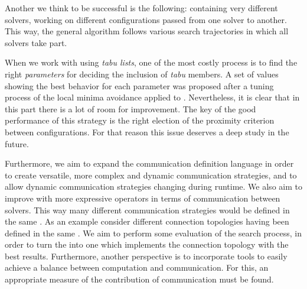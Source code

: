 
Another \commstr{} we think to be successful is the following: \sosets{} containing very different solvers, working on different configurations passed from one solver to another. This way, the general algorithm follows various search trajectories in which all solvers take part.

When we work with \commstrs{} using \textit{tabu lists}, one of the most costly process is to find the right {\it parameters} for deciding the inclusion of \textit{tabu} members. A set of values showing the best behavior for each parameter was proposed after a tuning process of the local minima avoidance \commstr{} applied to \grp. Nevertheless, it is clear that in this part there is a lot of room for improvement. The key of the good performance of this strategy is the right election of the proximity criterion between configurations. For that reason this issue deserves a deep study in the future.

Furthermore, we aim to expand the communication definition language in order to create versatile, more complex and dynamic communication strategies, and to allow dynamic communication strategies changing during runtime. We also aim to improve \posl{} with more expressive operators in terms of communication between solvers. %
This way many different communication strategies would be defined in the same \soset. As an example consider  different connection topologies having been defined in the same \commstr. We aim to perform some evaluation of the search process, in order to turn the \commstr{} into one which implements the connection topology with the best results. Furthermore, another perspective is to incorporate tools to easily achieve a balance between computation and communication. For this, an appropriate measure of the contribution of communication must be found.


